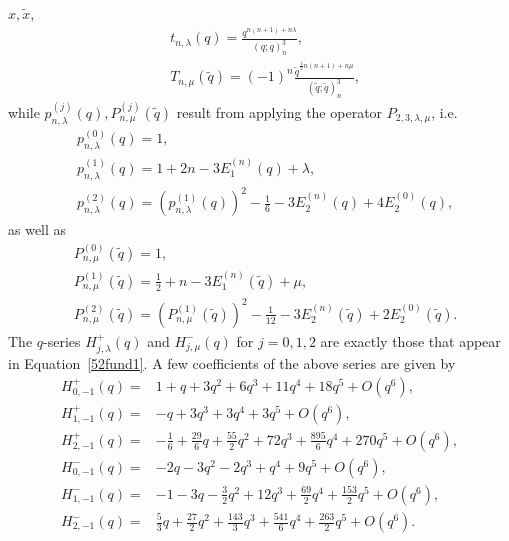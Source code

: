 \documentclass[12pt,reqno]{amsart}
\theoremstyle{definition}
\def\tq{\tilde{q}}
\def\tx{\tilde{x}}
\def\cO{O}
\begin{document}
  $x,\tx$,
  \begin{align}
    &t_{n,\lambda}(q) = \frac{q^{n(n+1)+n\lambda}}{(q;q)_n^3}, \\
    &T_{n,\mu}(\tq) = (-1)^n\frac{\tq^{\frac{1}{2}n(n+1)+n\mu}}{(\tq;\tq)_n^3},
  \end{align}
  while $p_{n,\lambda}^{(j)}(q), P_{n,\mu}^{(j)}(\tq)$ result from
  applying the operator $P_{2,3,\lambda,\mu}$, i.e.
  \begin{align}
    &p_{n,\lambda}^{(0)}(q) = 1, \\ 
    &p_{n,\lambda}^{(1)}(q) = 1+2n-3E_1^{(n)}(q) + \lambda, \\ 
    &p_{n,\lambda}^{(2)}(q) = \left(p_{n,\lambda}^{(1)}(q)\right)^2
      - \frac{1}{6} - 3 E_2^{(n)}(q) + 4 E_2^{(0)}(q),
  \end{align}
  as well as
  \begin{align}
    &P_{n,\mu}^{(0)}(\tq) = 1, \\ 
    &P_{n,\mu}^{(1)}(\tq) = \frac{1}{2}+n-3E_1^{(n)}(\tq) + \mu, \\ 
    &P_{n,\mu}^{(2)}(\tq) = \left(P_{n,\mu}^{(1)}(\tq)\right)^2
      - \frac{1}{12} - 3 E_2^{(n)}(\tq) + 2 E_2^{(0)}(\tq).
  \end{align}
  The $q$-series $H_{j,\lambda}^{+}(q)$ and $H_{j,\mu}^{-}(q)$ for
  $j=0,1,2$ are exactly those that appear in Equation~\eqref{52fund1}.
  A few coefficients of the above series are given by
  \begin{equation}
    \begin{aligned}
      H_{0,-1}^{+}(q) =
      &1+q+3q^2+6q^3+11q^4+18q^5+\cO(q^6),\\
      H_{1,-1}^{+}(q) =
      &-q+3q^3+3q^4+3q^5+\cO(q^6),\\
      H_{2,-1}^{+}(q) =
      &-\frac{1}{6}+\frac{29}{6}q+\frac{55}{2}q^2+72q^3
      +\frac{895}{6}q^4+270q^5+\cO(q^6),\\
      H_{0,-1}^{-}(q) =
      &-2q-3q^2-2q^3+q^4+9q^5+\cO(q^6),\\
      H_{1,-1}^{-}(q) =
      &-1-3q-\frac{3}{2}q^2+12q^3+\frac{69}{2}q^4+\frac{153}{2}q^5+\cO(q^6),\\
      H_{2,-1}^{-}(q) =
      &\frac{5}{3}q+\frac{27}{2}q^2+\frac{143}{3}q^3+\frac{541}{6}q^4
      +\frac{263}{2}q^5+\cO(q^6).
    \end{aligned}
  \end{equation}
\end{document}
